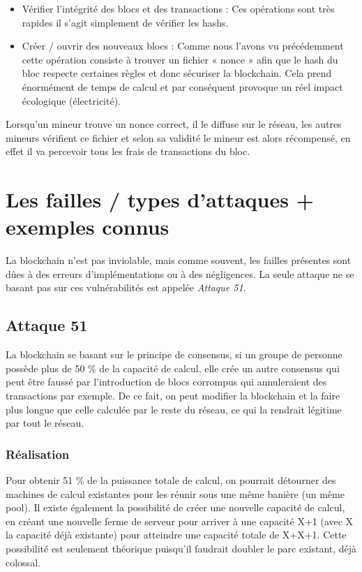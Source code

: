 \documentclass[12pt, a4paper, oneside]{book}
\begin{document}
    \begin{itemize}
        \item Vérifier l’intégrité des blocs et des transactions : Ces opérations sont très rapides il s’agit simplement de vérifier les hashs.
        \item Créer / ouvrir des nouveaux blocs : Comme nous l’avons vu précédemment cette opération consiste à trouver un fichier « nonce » afin que le hash du bloc respecte certaines règles et donc sécuriser la blockchain. Cela prend énormément de temps de calcul et par conséquent provoque un réel impact écologique (électricité).
        \newline
    \end{itemize}

    Lorsqu’un mineur trouve un nonce correct, il le diffuse sur le réseau, les autres mineurs vérifient ce fichier et selon sa validité le mineur est alors récompensé, en effet il va percevoir tous les frais de transactions du bloc.

    \chapter{Les failles / types d'attaques + exemples connus}
    La blockchain n'est pas inviolable, mais comme souvent, les failles présentes sont dûes à des erreurs d'implémentations ou à des négligences. La seule attaque ne se basant pas sur ces vulnérabilités est appelée \emph{Attaque 51}.
    \section{Attaque 51}
    La blockchain se basant sur le principe de consensus, si un groupe de personne possède plus de 50 \% de la capacité de calcul, elle crée un autre consensus qui peut être faussé par l'introduction de blocs corrompus qui annuleraient des transactions par exemple. De ce fait, on peut modifier la blockchain et la faire plus longue que celle calculée par le reste du réseau, ce qui la rendrait légitime par tout le réseau.
    \subsection{Réalisation}
    Pour obtenir 51 \% de la puissance totale de calcul, on pourrait détourner des machines de calcul existantes pour les réunir sous une même banière (un même pool).
    Il existe également la possibilité de créer une nouvelle capacité de calcul, en créant une nouvelle ferme de serveur pour arriver à une capacité X+1 (avec X la capacité déjà existante) pour atteindre une capacité totale de X+X+1. Cette possibilité est seulement théorique puisqu'il faudrait doubler le parc existant, déjà colossal.
\end{document}
